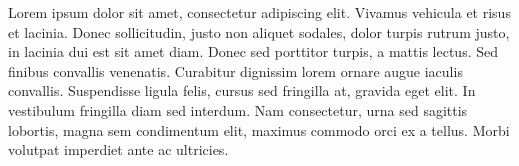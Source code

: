 Lorem ipsum dolor sit amet, consectetur adipiscing elit. Vivamus vehicula et risus et lacinia. Donec sollicitudin, justo non aliquet sodales, dolor turpis rutrum justo, in lacinia dui est sit amet diam. Donec sed porttitor turpis, a mattis lectus. Sed finibus convallis venenatis. Curabitur dignissim lorem ornare augue iaculis convallis. Suspendisse ligula felis, cursus sed fringilla at, gravida eget elit. In vestibulum fringilla diam sed interdum. Nam consectetur, urna sed sagittis lobortis, magna sem condimentum elit, maximus commodo orci ex a tellus. Morbi volutpat imperdiet ante ac ultricies. 


